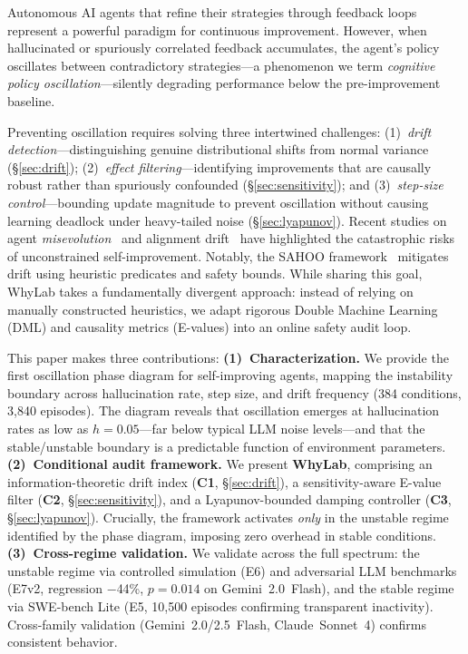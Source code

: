 \documentclass{article}
\begin{document}

Autonomous AI agents that refine their strategies through feedback
loops~\cite{shinn2023reflexion,yao2023react} represent a powerful
paradigm for continuous improvement. However, when hallucinated or
spuriously correlated feedback accumulates, the agent's policy
oscillates between contradictory strategies---a phenomenon we term
\emph{cognitive policy oscillation}---silently degrading performance
below the pre-improvement baseline.

Preventing oscillation requires solving three intertwined challenges:
(1)~\emph{drift detection}---distinguishing genuine distributional
shifts from normal variance (\S\ref{sec:drift});
(2)~\emph{effect filtering}---identifying improvements that are
causally robust rather than spuriously confounded
(\S\ref{sec:sensitivity}); and
(3)~\emph{step-size control}---bounding update magnitude to prevent
oscillation without causing learning deadlock under heavy-tailed noise
(\S\ref{sec:lyapunov}).
Recent studies on agent \emph{misevolution}~\cite{misevolution2025} and alignment drift~\cite{sahoo2026sahoo} have highlighted the catastrophic risks of unconstrained self-improvement. Notably, the SAHOO framework~\cite{sahoo2026sahoo} mitigates drift using heuristic predicates and safety bounds. While sharing this goal, WhyLab takes a fundamentally divergent approach: instead of relying on manually constructed heuristics, we adapt rigorous Double Machine Learning (DML) and causality metrics (E-values) into an online safety audit loop.

This paper makes three contributions:
\textbf{(1)~Characterization.} We provide the first oscillation phase diagram for self-improving agents, mapping the instability boundary across hallucination rate, step size, and drift frequency (384 conditions, 3{,}840 episodes). The diagram reveals that oscillation emerges at hallucination rates as low as $h{=}0.05$---far below typical LLM noise levels---and that the stable/unstable boundary is a predictable function of environment parameters.
\textbf{(2)~Conditional audit framework.} We present \textbf{WhyLab}, comprising an information-theoretic drift index (\textbf{C1}, \S\ref{sec:drift}), a sensitivity-aware E-value filter (\textbf{C2}, \S\ref{sec:sensitivity}), and a Lyapunov-bounded damping controller (\textbf{C3}, \S\ref{sec:lyapunov}). Crucially, the framework activates \emph{only} in the unstable regime identified by the phase diagram, imposing zero overhead in stable conditions.
\textbf{(3)~Cross-regime validation.} We validate across the full spectrum: the unstable regime via controlled simulation (E6) and adversarial LLM benchmarks (E7v2, regression $-$44\%, $p{=}0.014$ on Gemini~2.0~Flash), and the stable regime via SWE-bench Lite (E5, 10{,}500 episodes confirming transparent inactivity). Cross-family validation (Gemini~2.0/2.5~Flash, Claude~Sonnet~4) confirms consistent behavior.
\end{document}
